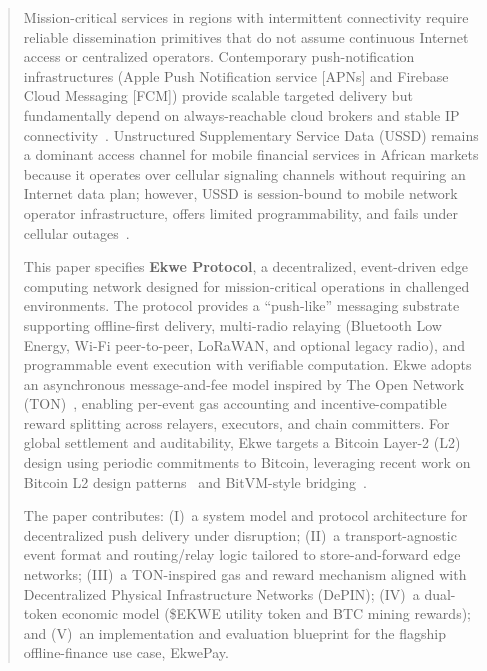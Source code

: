 \documentclass[11pt,a4paper]{article}
\begin{document}
\newpage
\begin{abstract}
\noindent
Mission-critical services in regions with intermittent connectivity require reliable dissemination primitives that do not assume continuous Internet access or centralized operators. Contemporary push-notification infrastructures (Apple Push Notification service [APNs] and Firebase Cloud Messaging [FCM]) provide scalable targeted delivery but fundamentally depend on always-reachable cloud brokers and stable IP connectivity~\cite{apns}. Unstructured Supplementary Service Data (USSD) remains a dominant access channel for mobile financial services in African markets because it operates over cellular signaling channels without requiring an Internet data plan; however, USSD is session-bound to mobile network operator infrastructure, offers limited programmability, and fails under cellular outages~\cite{etsi_ussd_stage1}.

This paper specifies \textbf{Ekwe Protocol}, a decentralized, event-driven edge computing network designed for mission-critical operations in challenged environments. The protocol provides a ``push-like'' messaging substrate supporting offline-first delivery, multi-radio relaying (Bluetooth Low Energy, Wi-Fi peer-to-peer, LoRaWAN, and optional legacy radio), and programmable event execution with verifiable computation. Ekwe adopts an asynchronous message-and-fee model inspired by The Open Network (TON)~\cite{ton_whitepaper}, enabling per-event gas accounting and incentive-compatible reward splitting across relayers, executors, and chain committers. For global settlement and auditability, Ekwe targets a Bitcoin Layer-2 (L2) design using periodic commitments to Bitcoin, leveraging recent work on Bitcoin L2 design patterns~\cite{sok_btc_l2} and BitVM-style bridging~\cite{bitvm2}.

The paper contributes: (I)~a system model and protocol architecture for decentralized push delivery under disruption; (II)~a transport-agnostic event format and routing/relay logic tailored to store-and-forward edge networks; (III)~a TON-inspired gas and reward mechanism aligned with Decentralized Physical Infrastructure Networks (DePIN); (IV)~a dual-token economic model (\$EKWE utility token and BTC mining rewards); and (V)~an implementation and evaluation blueprint for the flagship offline-finance use case, EkwePay.
\end{abstract}
\end{document}
